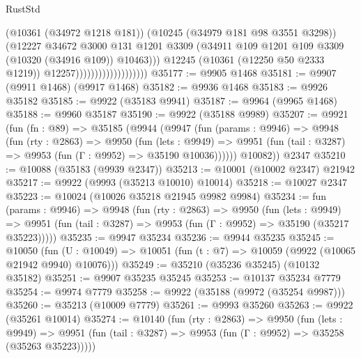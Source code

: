 \begin{lexlean}{RustStd}
\begin{coremodule}
                                            (@10361 (@34972 @1218 @181))
                                            (@10245 (@34979 @181 @98 @3551 @3298))
                                            (@12227
                                              @34672
                                              @3000
                                              @131
                                              @1201
                                              @3309
                                              (@34911
                                                @109
                                                @1201
                                                @109
                                                @3309
                                                (@10320 (@34916 @109))
                                                @10463)))
                                          @12245
                                          (@10361 (@12250 @50 @2333 @1219))
                                          @12257)))))))))))))))))))
@35177 := @9905 @1468
@35181 := @9907 (@9911 @1468) (@9917 @1468)
@35182 := @9936 @1468
@35183 := @9926 @35182
@35185 := @9922 (@35183 @9941)
@35187 := @9964 (@9965 @1468)
@35188 := @9960 @35187
@35190 := @9922 (@35188 @9989)
@35207 := @9921
    (fun (fn : @89) =>
    @35185
      (@9944
        (@9947
          (fun (params : @9946) =>
          @9948
            (fun (rty : @2863) =>
            @9950
              (fun (lets : @9949) =>
              @9951 (fun (tail : @3287) => @9953 (fun (Γ : @9952) => @35190 @10036))))))
        @10082))
    @2347
@35210 := @10088 (@35183 (@9939 @2347))
@35213 := @10001 (@10002 @2347) @21942
@35217 := @9922 (@9993 (@35213 @10010) @10014)
@35218 := @10027 @2347
@35223 := @10024 (@10026 @35218 @21945 @9982 @9984)
@35234 := fun (params : @9946) =>
  @9948
    (fun (rty : @2863) =>
    @9950
      (fun (lets : @9949) =>
      @9951 (fun (tail : @3287) => @9953 (fun (Γ : @9952) => @35190 (@35217 @35223)))))
@35235 := @9947 @35234
@35236 := @9944 @35235
@35245 := @10050
    (fun (U : @10049) => @10051 (fun (t : @7) => @10059 (@9922 (@10065 @21942 @9940) @10076)))
@35249 := @35210 (@35236 @35245) (@10132 @35182)
@35251 := @9907 @35235 @35245
@35253 := @10137 @35234 @7779
@35254 := @9974 @7779
@35258 := @9922 (@35188 (@9972 (@35254 @9987)))
@35260 := @35213 (@10009 @7779)
@35261 := @9993 @35260
@35263 := @9922 (@35261 @10014)
@35274 := @10140
    (fun (rty : @2863) =>
    @9950
      (fun (lets : @9949) =>
      @9951 (fun (tail : @3287) => @9953 (fun (Γ : @9952) => @35258 (@35263 @35223)))))

\end{coremodule}
\end{lexlean}
